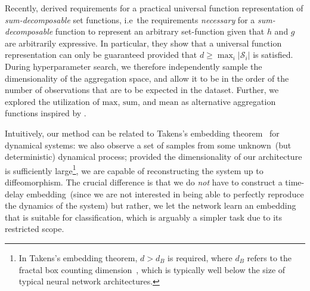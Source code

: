 \documentclass{article}
\begin{document}
Recently, \citet{Wagstaff2019} derived requirements for a practical universal
function representation of \emph{sum-decomposable} set functions, i.e\ the
requirements \emph{necessary} for a \emph{sum-decomposable} function to
represent an arbitrary set-function given that $h$ and $g$ are arbitrarily
expressive.  In particular, they show that a universal function representation
can only be guaranteed provided that
$d \geq \max_i |\mathcal{S}_i|$
is satisfied.  
During hyperparameter search, we therefore independently sample the
dimensionality of the aggregation space, and allow it to be in the order
of the number of observations that are to be expected in the dataset.
Further, we explored the utilization of $\text{max}$, $\text{sum}$, and
$\text{mean}$ as alternative aggregation functions inspired by
\citet{zaheer2017deep,garnelo2018conditional}.

Intuitively, our method can be related to
Takens's embedding theorem~\citep{Takens81} for dynamical systems:
we also observe a set of samples from some unknown~(but deterministic)
dynamical process; provided the dimensionality of our architecture is
sufficiently large\footnote{In Takens's embedding theorem, $d > d_B$ is required, where $d_B$
  refers to the fractal box counting dimension~\citep{Liebovitch89},
  which is typically well below the size of typical neural network
  architectures.
}, we are capable of reconstructing the system up to diffeomorphism.
The crucial difference is that we do \emph{not} have to construct
a time-delay embedding~(since we are not interested in being able to
perfectly reproduce the dynamics of the system) but rather, we let the
network learn an embedding that is suitable for classification, which is
arguably a simpler task due to its restricted scope.
\end{document}
